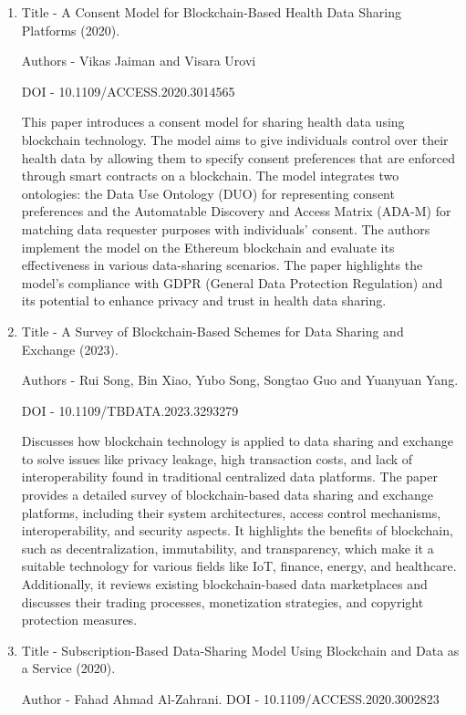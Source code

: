 \documentclass[12pt]{report}	%
\begin{document}
{{\begin{itemize}
\begin{enumerate}
\item{Title - A Consent Model for Blockchain-Based
Health Data Sharing Platforms (2020).}

Authors - Vikas Jaiman and Visara Urovi

DOI - 10.1109/ACCESS.2020.3014565

This paper introduces a consent model for sharing health data using blockchain technology. The model aims to give individuals control over their health data by allowing them to specify consent preferences that are enforced through smart contracts on a blockchain. The model integrates two ontologies: the Data Use Ontology (DUO) for representing consent preferences and the Automatable Discovery and Access Matrix (ADA-M) for matching data requester purposes with individuals' consent. The authors implement the model on the Ethereum blockchain and evaluate its effectiveness in various data-sharing scenarios. The paper highlights the model's compliance with GDPR (General Data Protection Regulation) and its potential to enhance privacy and trust in health data sharing.

\item{Title - A Survey of Blockchain-Based Schemes for Data Sharing and Exchange (2023).}

Authors - Rui Song, Bin Xiao, Yubo Song, Songtao Guo and Yuanyuan Yang.

DOI - 10.1109/TBDATA.2023.3293279


Discusses how blockchain technology is applied to data sharing and exchange to solve issues like privacy leakage, high transaction costs, and lack of interoperability found in traditional centralized data platforms. The paper provides a detailed survey of blockchain-based data sharing and exchange platforms, including their system architectures, access control mechanisms, interoperability, and security aspects. It highlights the benefits of blockchain, such as decentralization, immutability, and transparency, which make it a suitable technology for various fields like IoT, finance, energy, and healthcare. Additionally, it reviews existing blockchain-based data marketplaces and discusses their trading processes, monetization strategies, and copyright protection measures.

\item{Title - Subscription-Based Data-Sharing Model Using
Blockchain and Data as a Service (2020).}

Author - Fahad Ahmad Al-Zahrani.
\newline
DOI - 10.1109/ACCESS.2020.3002823


\end{enumerate}
\end{itemize}}}
\end{document}
